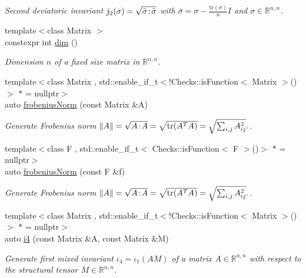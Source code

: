 \begin{DoxyCompactItemize}
\begin{DoxyCompactList}\small\item\em \-Second deviatoric invariant $ j_2(\sigma)=\sqrt{\bar\sigma\negthinspace:\negthinspace\bar\sigma} $ with $\bar\sigma = \sigma - \frac{\mathrm{tr}(\sigma)}{n}I$ and $\sigma\in\mathbb{R}^{n,n}$. \end{DoxyCompactList}\item 
{\footnotesize template$<$class Matrix $>$ }\\constexpr int \hyperlink{namespaceFunG_1_1LinearAlgebra_a13a029820c29d530274ae94968d642d4}{dim} ()
\begin{DoxyCompactList}\small\item\em \-Dimension $n$ of a fixed size matrix in $\mathbb{R}^{n,n}$. \end{DoxyCompactList}\item 
{\footnotesize template$<$class Matrix , std\-::enable\-\_\-if\-\_\-t$<$!\-Checks\-::is\-Function$<$ Matrix $>$()$>$ $\ast$  = nullptr$>$ }\\auto \hyperlink{group__LinearAlgebraGroup_gaa893e7d667dde98d2b119ca004745186}{frobenius\-Norm} (const \-Matrix \&\-A)
\begin{DoxyCompactList}\small\item\em \-Generate \-Frobenius norm $ \|A\| = \sqrt{A\negthinspace : \negthinspace A }= \sqrt{\mathrm{tr}(A^TA)} = \sqrt{\sum_{i,j} A_{ij}^2}. $. \end{DoxyCompactList}\item 
{\footnotesize template$<$class F , std\-::enable\-\_\-if\-\_\-t$<$ Checks\-::is\-Function$<$ F $>$()$>$ $\ast$  = nullptr$>$ }\\auto \hyperlink{group__LinearAlgebraGroup_gafa2f358f9310cecb787620ad8ec460a6}{frobenius\-Norm} (const \-F \&f)
\begin{DoxyCompactList}\small\item\em \-Generate \-Frobenius norm $ \|A\| = \sqrt{A\negthinspace : \negthinspace A }= \sqrt{\mathrm{tr}(A^TA)} = \sqrt{\sum_{i,j} A_{ij}^2}. $. \end{DoxyCompactList}\item 
{\footnotesize template$<$class Matrix , std\-::enable\-\_\-if\-\_\-t$<$!\-Checks\-::is\-Function$<$ Matrix $>$()$>$ $\ast$  = nullptr$>$ }\\auto \hyperlink{group__InvariantGroup_ga1898785172ecce11af0c27e54d555009}{i4} (const \-Matrix \&\-A, const \-Matrix \&\-M)
\begin{DoxyCompactList}\small\item\em \-Generate first mixed invariant $ \iota_4=\iota_1(AM) $ of a matrix $A\in\mathbb{R}^{n,n}$ with respect to the structural tensor $M\in\mathbb{R}^{n,n}$. \end{DoxyCompactList}\item 

\end{DoxyCompactItemize}
